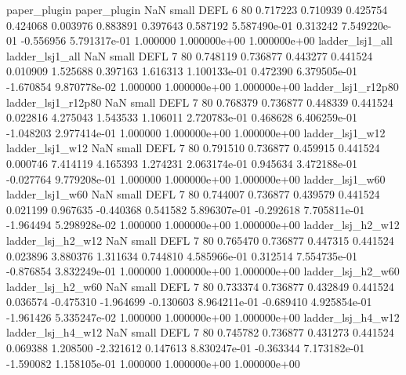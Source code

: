             paper_plugin             paper_plugin                   NaN      small     DEFL                 6 80 0.717223       0.710939 0.425754       0.424068    0.003976      0.883891      0.397643     0.587192   5.587490e-01  0.313242 7.549220e-01    -0.556956   5.791317e-01            1.000000    1.000000e+00        1.000000e+00
         ladder_lsj1_all          ladder_lsj1_all                   NaN      small     DEFL                 7 80 0.748119       0.736877 0.443277       0.441524    0.010909      1.525688      0.397163     1.616313   1.100133e-01  0.472390 6.379505e-01    -1.670854   9.870778e-02            1.000000    1.000000e+00        1.000000e+00
      ladder_lsj1_r12p80       ladder_lsj1_r12p80                   NaN      small     DEFL                 7 80 0.768379       0.736877 0.448339       0.441524    0.022816      4.275043      1.543533     1.106011   2.720783e-01  0.468628 6.406259e-01    -1.048203   2.977414e-01            1.000000    1.000000e+00        1.000000e+00
         ladder_lsj1_w12          ladder_lsj1_w12                   NaN      small     DEFL                 7 80 0.791510       0.736877 0.459915       0.441524    0.000746      7.414119      4.165393     1.274231   2.063174e-01  0.945634 3.472188e-01    -0.027764   9.779208e-01            1.000000    1.000000e+00        1.000000e+00
         ladder_lsj1_w60          ladder_lsj1_w60                   NaN      small     DEFL                 7 80 0.744007       0.736877 0.439579       0.441524    0.021199      0.967635     -0.440368     0.541582   5.896307e-01 -0.292618 7.705811e-01    -1.964494   5.298928e-02            1.000000    1.000000e+00        1.000000e+00
       ladder_lsj_h2_w12        ladder_lsj_h2_w12                   NaN      small     DEFL                 7 80 0.765470       0.736877 0.447315       0.441524    0.023896      3.880376      1.311634     0.744810   4.585966e-01  0.312514 7.554735e-01    -0.876854   3.832249e-01            1.000000    1.000000e+00        1.000000e+00
       ladder_lsj_h2_w60        ladder_lsj_h2_w60                   NaN      small     DEFL                 7 80 0.733374       0.736877 0.432849       0.441524    0.036574     -0.475310     -1.964699    -0.130603   8.964211e-01 -0.689410 4.925854e-01    -1.961426   5.335247e-02            1.000000    1.000000e+00        1.000000e+00
       ladder_lsj_h4_w12        ladder_lsj_h4_w12                   NaN      small     DEFL                 7 80 0.745782       0.736877 0.431273       0.441524    0.069388      1.208500     -2.321612     0.147613   8.830247e-01 -0.363344 7.173182e-01    -1.590082   1.158105e-01            1.000000    1.000000e+00        1.000000e+00
